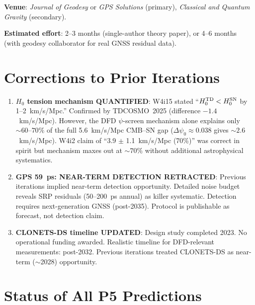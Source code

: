 \documentclass[11pt,a4paper]{article}
\newcounter{findingctr}
\newenvironment{finding}[1][]{%
  \refstepcounter{findingctr}%
  \begin{tcolorbox}[colback=blue!3!white, colframe=blue!50!black,
    title=\textbf{Finding \thefindingctr: #1}]
}{%
  \end{tcolorbox}%
}
\newcommand{\Dpsi}{\Delta\psi}
\begin{document}
\begin{finding}[\textbf{GPS Protocol: Publishable Methods Paper,
  Detection Not Achievable Now}]
\textbf{Venue}: \emph{Journal of Geodesy} or \emph{GPS Solutions}
(primary), \emph{Classical and Quantum Gravity} (secondary).

\textbf{Estimated effort}: 2--3 months (single-author theory paper),
or 4--6 months (with geodesy collaborator for real GNSS residual data).

\end{finding}


\section*{Corrections to Prior Iterations}

\begin{enumerate}

\item \textbf{$H_0$ tension mechanism QUANTIFIED}: W4i15 stated
  ``$H_0^{\rm TD} < H_0^{\rm SN}$ by 1--2~km/s/Mpc.''  Confirmed
  by TDCOSMO~2025 (difference $-1.4$~km/s/Mpc).  However, the DFD
  $\psi$-screen mechanism alone explains only $\sim 60$--$70\%$
  of the full 5.6~km/s/Mpc CMB--SN gap ($\Dpsi_0 \approx 0.038$
  gives $\sim 2.6$~km/s/Mpc).  W4i2 claim of ``3.9 $\pm$ 1.1~km/s/Mpc
  (70\%)'' was correct in spirit but mechanism maxes out at
  $\sim 70\%$ without additional astrophysical systematics.

\item \textbf{GPS 59~ps: NEAR-TERM DETECTION RETRACTED}: Previous
  iterations implied near-term detection opportunity.  Detailed
  noise budget reveals SRP residuals (50--200~ps annual) as killer
  systematic.  Detection requires next-generation GNSS (post-2035).
  Protocol is publishable as forecast, not detection claim.

\item \textbf{CLONETS-DS timeline UPDATED}: Design study completed
  2023.  No operational funding awarded.  Realistic timeline for
  DFD-relevant measurements: post-2032.  Previous iterations
  treated CLONETS-DS as near-term ($\sim$2028) opportunity.

\end{enumerate}


\section*{Status of All P5 Predictions}
\end{document}
